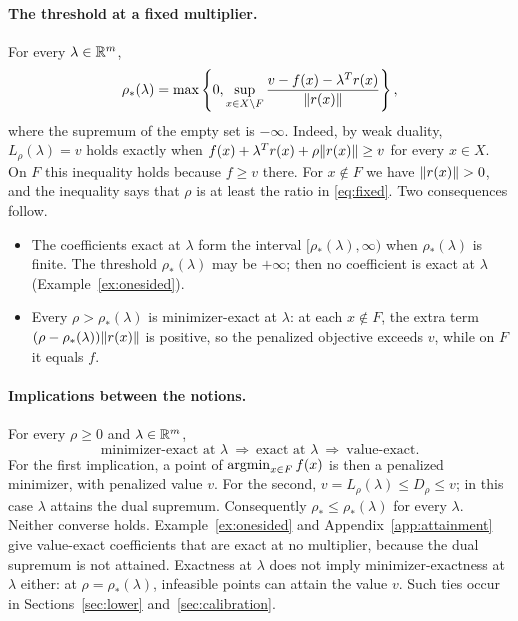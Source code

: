 \paragraph{The threshold at a fixed multiplier.}
For every $\lambda\in\mathbb R^m$,
\begin{equation}\label{eq:fixed}
 \rho_*(\lambda)=\max\left\{0,\sup_{x\in X\setminus F}
 \frac{v-f(x)-\lambda^Tr(x)}{\lVert r(x)\rVert}\right\},
\end{equation}
where the supremum of the empty set is $-\infty$. Indeed, by weak
duality, $L_\rho(\lambda)=v$ holds exactly when
$f(x)+\lambda^Tr(x)+\rho\lVert r(x)\rVert\ge v$ for every $x\in X$. On $F$
this inequality holds because $f\ge v$ there. For $x\notin F$ we have
$\lVert r(x)\rVert>0$, and the inequality says that $\rho$ is at least the
ratio in \eqref{eq:fixed}. Two consequences follow.
\begin{itemize}
\item The coefficients exact at $\lambda$ form the interval
 $[\rho_*(\lambda),\infty)$ when $\rho_*(\lambda)$ is finite. The
 threshold $\rho_*(\lambda)$ may be $+\infty$; then no coefficient is
 exact at $\lambda$ (Example~\ref{ex:onesided}).
\item Every $\rho>\rho_*(\lambda)$ is minimizer-exact at $\lambda$: at
 each $x\notin F$, the extra term $(\rho-\rho_*(\lambda))\lVert r(x)\rVert$
 is positive, so the penalized objective exceeds $v$, while on $F$ it
 equals $f$.
\end{itemize}

\paragraph{Implications between the notions.}
For every $\rho\ge0$ and $\lambda\in\mathbb R^m$,
\[
 \text{minimizer-exact at }\lambda\ \Longrightarrow\
 \text{exact at }\lambda\ \Longrightarrow\ \text{value-exact}.
\]
For the first implication, a point of $\operatorname{argmin}_{x\in F}f(x)$ is then a
penalized minimizer, with penalized value $v$. For the second,
$v=L_\rho(\lambda)\le D_\rho\le v$; in this case $\lambda$ attains the
dual supremum. Consequently $\rho_*\le\rho_*(\lambda)$ for every
$\lambda$. Neither converse holds. Example~\ref{ex:onesided} and
Appendix~\ref{app:attainment} give value-exact coefficients that are
exact at no multiplier, because the dual supremum is not attained.
Exactness at $\lambda$ does not imply minimizer-exactness at $\lambda$
either: at $\rho=\rho_*(\lambda)$, infeasible points can attain the
value $v$. Such ties occur in Sections~\ref{sec:lower}
and~\ref{sec:calibration}.

